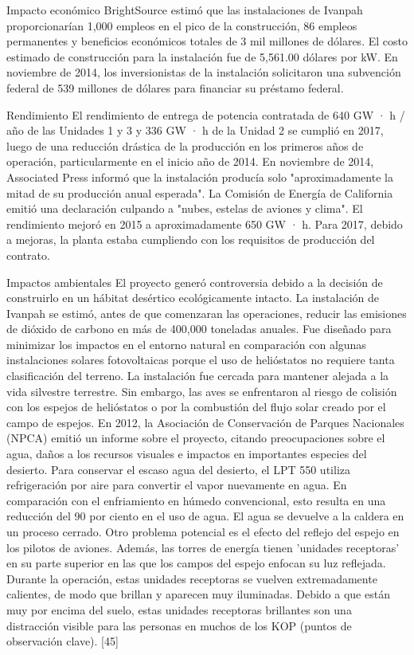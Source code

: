 \documentclass[12pt]{article}
\begin{document}
Impacto económico
BrightSource estimó que las instalaciones de Ivanpah proporcionarían 1,000 empleos en el pico de la construcción, 86 empleos permanentes y beneficios económicos totales de 3 mil millones de dólares.
El costo estimado de construcción para la instalación fue de 5,561.00 dólares por kW.
En noviembre de 2014, los inversionistas de la instalación solicitaron una subvención federal de 539 millones de dólares para financiar su préstamo federal.
 
Rendimiento
El rendimiento de entrega de potencia contratada de 640 GW · h / año de las Unidades 1 y 3 y 336 GW · h de la Unidad 2 se cumplió en 2017, luego de una reducción drástica de la producción en los primeros años de operación, particularmente en el inicio año de 2014.
En noviembre de 2014, Associated Press informó que la instalación producía solo "aproximadamente la mitad de su producción anual esperada". La Comisión de Energía de California emitió una declaración culpando a "nubes, estelas de aviones y clima". El rendimiento mejoró en 2015 a aproximadamente 650 GW · h.
Para 2017, debido a mejoras, la planta estaba cumpliendo con los requisitos de producción del contrato.
 
Impactos ambientales
El proyecto generó controversia debido a la decisión de construirlo en un hábitat desértico ecológicamente intacto. La instalación de Ivanpah se estimó, antes de que comenzaran las operaciones, reducir las emisiones de dióxido de carbono en más de 400,000 toneladas anuales. Fue diseñado para minimizar los impactos en el entorno natural en comparación con algunas instalaciones solares fotovoltaicas porque el uso de helióstatos no requiere tanta clasificación del terreno. La instalación fue cercada para mantener alejada a la vida silvestre terrestre. Sin embargo, las aves se enfrentaron al riesgo de colisión con los espejos de helióstatos o por la combustión del flujo solar creado por el campo de espejos.
En 2012, la Asociación de Conservación de Parques Nacionales (NPCA) emitió un informe sobre el proyecto, citando preocupaciones sobre el agua, daños a los recursos visuales e impactos en importantes especies del desierto. Para conservar el escaso agua del desierto, el LPT 550 utiliza refrigeración por aire para convertir el vapor nuevamente en agua. En comparación con el enfriamiento en húmedo convencional, esto resulta en una reducción del 90 por ciento en el uso de agua. El agua se devuelve a la caldera en un proceso cerrado.
Otro problema potencial es el efecto del reflejo del espejo en los pilotos de aviones. Además, las torres de energía tienen 'unidades receptoras' en su parte superior en las que los campos del espejo enfocan su luz reflejada. Durante la operación, estas unidades receptoras se vuelven extremadamente calientes, de modo que brillan y aparecen muy iluminadas. Debido a que están muy por encima del suelo, estas unidades receptoras brillantes son una distracción visible para las personas en muchos de los KOP (puntos de observación clave). [45]
 
\end{document}
